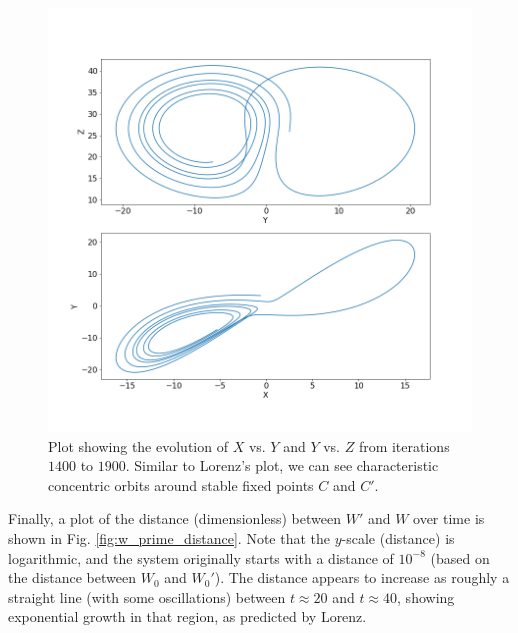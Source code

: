 \documentclass{article}
\begin{document}
\begin{figure}
    \hspace{-15mm}
    \includegraphics[scale=0.6]{lorenz_fig_2.png}
    \caption{Plot showing the evolution of $X$ vs. $Y$ and $Y$ vs. $Z$ from iterations $1400$ to $1900$. Similar to Lorenz's plot, we can see characteristic concentric orbits around stable fixed points $C$ and $C'$.}
    \label{fig:lorenz_2}
\end{figure}

Finally, a plot of the distance (dimensionless) between $W'$ and $W$ over time is shown in Fig. \ref{fig:w_prime_distance}. Note that the $y$-scale (distance) is logarithmic, and the system originally starts with a distance of $10^{-8}$ (based on the distance between $W_0$ and $W_0'$). The distance appears to increase as roughly a straight line (with some oscillations) between $t \approx 20$ and $t \approx 40$, showing exponential growth in that region, as predicted by Lorenz.
\end{document}
